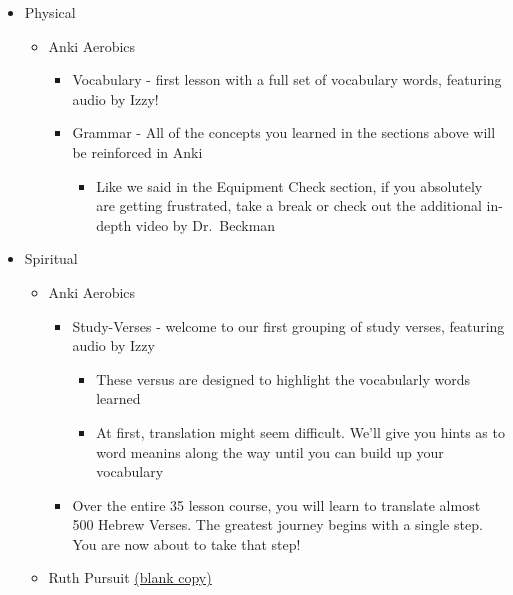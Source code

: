 \documentclass[
]{turabian-researchpaper}
\providecommand{\tightlist}{%
  \setlength{\itemsep}{0pt}\setlength{\parskip}{0pt}}
\begin{document}
\begin{itemize}
\tightlist
\item
  Physical

  \begin{itemize}
  \tightlist
  \item
    Anki Aerobics

    \begin{itemize}
    \tightlist
    \item
      Vocabulary - first lesson with a full set of vocabulary words, featuring audio by Izzy!
    \item
      Grammar - All of the concepts you learned in the sections above will be reinforced in Anki

      \begin{itemize}
      \tightlist
      \item
        Like we said in the Equipment Check section, if you absolutely are getting frustrated, take a break or check out the additional in-depth video by Dr.~Beckman
      \end{itemize}
    \end{itemize}
  \end{itemize}
\item
  Spiritual

  \begin{itemize}
  \tightlist
  \item
    Anki Aerobics

    \begin{itemize}
    \tightlist
    \item
      Study-Verses - welcome to our first grouping of study verses, featuring audio by Izzy

      \begin{itemize}
      \tightlist
      \item
        These versus are designed to highlight the vocabularly words learned
      \item
        At first, translation might seem difficult. We'll give you hints as to word meanins along the way until you can build up your vocabulary
      \end{itemize}
    \item
      Over the entire 35 lesson course, you will learn to translate almost 500 Hebrew Verses. The greatest journey begins with a single step. You are now about to take that step!
    \end{itemize}
  \item
    Ruth Pursuit \href{https://drive.google.com/file/d/1qcfTKAlTJGChC2eYCMhSbY2w-ibzCcDV/view?usp=sharing}{(blank copy)}


\end{itemize}
\end{itemize}
\end{document}
